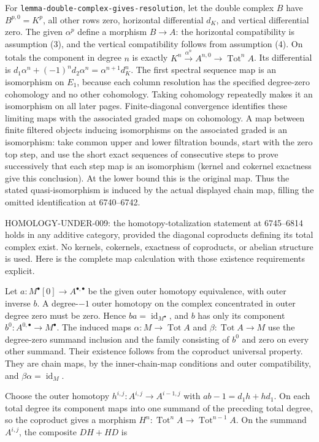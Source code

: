 \documentclass[11pt]{article}
\begin{document}
For \texttt{lemma-double-complex-gives-resolution}, let the double complex \(B\) have \(B^{p,0}=K^p\), all other rows zero, horizontal differential \(d_K\), and vertical differential zero. The given \(\alpha^p\) define a morphism \(B\to A\): the horizontal compatibility is assumption (3), and the vertical compatibility follows from assumption (4). On totals the component in degree \(n\) is exactly \(K^n\xrightarrow{\alpha^n}A^{n,0}\to\operatorname{Tot}^nA\). Its differential is \(d_1\alpha^n+(-1)^n d_2\alpha^n
=\alpha^{n+1}d_K^n\). The first spectral sequence map is an isomorphism on \(E_1\), because each column resolution has the specified degree-zero cohomology and no other cohomology. Taking cohomology repeatedly makes it an isomorphism on all later pages. Finite-diagonal convergence identifies these limiting maps with the associated graded maps on cohomology. A map between finite filtered objects inducing isomorphisms on the associated graded is an isomorphism: take common upper and lower filtration bounds, start with the zero top step, and use the short exact sequences of consecutive steps to prove successively that each step map is an isomorphism (kernel and cokernel exactness give this conclusion). At the lower bound this is the original map. Thus the stated quasi-isomorphism is induced by the actual displayed chain map, filling the omitted identification at 6740--6742.

HOMOLOGY-UNDER-009: the homotopy-totalization statement at 6745--6814 holds in any additive category, provided the diagonal coproducts defining its total complex exist. No kernels, cokernels, exactness of coproducts, or abelian structure is used. Here is the complete map calculation with those existence requirements explicit.

Let \(a:M^\bullet[0]\to A^{\bullet,\bullet}\) be the given outer homotopy equivalence, with outer inverse \(b\). A degree-\(-1\) outer homotopy on the complex concentrated in outer degree zero must be zero. Hence \(ba=\operatorname{id}_{M^\bullet}\), and \(b\) has only its component \(b^0:A^{0,\bullet}\to M^\bullet\). The induced maps \(\alpha:M\to\operatorname{Tot}A\) and \(\beta:\operatorname{Tot}A\to M\) use the degree-zero summand inclusion and the family consisting of \(b^0\) and zero on every other summand. Their existence follows from the coproduct universal property. They are chain maps, by the inner-chain-map conditions and outer compatibility, and \(\beta\alpha=\operatorname{id}_M\).

Choose the outer homotopy \(h^{i,j}:A^{i,j}\to A^{i-1,j}\) with \(ab-1=d_1h+hd_1\). On each total degree its component maps into one summand of the preceding total degree, so the coproduct gives a morphism \(H^n:\operatorname{Tot}^nA\to\operatorname{Tot}^{n-1}A\). On the summand \(A^{i,j}\), the composite \(DH+HD\) is
\end{document}
